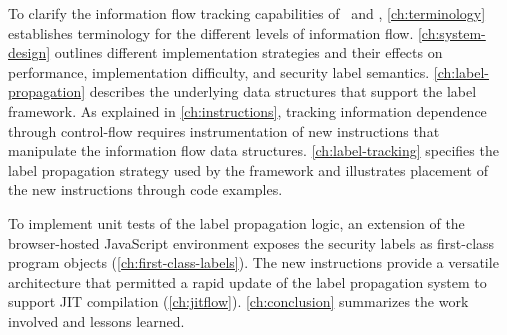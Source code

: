 To clarify the information flow tracking capabilities of \FlowCore\ and \JitFlow, \autoref{ch:terminology} establishes terminology for the different levels of information flow.
\autoref{ch:system-design} outlines different implementation strategies and their effects on performance, implementation difficulty, and security label semantics.
\autoref{ch:label-propagation} describes the underlying data structures that support the label framework.
As explained in \autoref{ch:instructions}, tracking information dependence through control-flow requires instrumentation of new instructions that manipulate the information flow data structures.
\autoref{ch:label-tracking} specifies the label propagation strategy used by the framework and illustrates placement of the new instructions through code examples.

To implement unit tests of the label propagation logic, an extension of the browser-hosted JavaScript environment exposes the security labels as first-class program objects (\autoref{ch:first-class-labels}).
The new instructions provide a versatile architecture that permitted a rapid update of the label propagation system to support JIT compilation (\autoref{ch:jitflow}).
\autoref{ch:conclusion} summarizes the work involved and lessons learned.

\begin{comment}
on using information flow techniques which can detect and prevent malicious behavior of executing programs.

- change language semantics
- augment memory model with labels
- detect and intercept xss
- prevent information leakage

Combine earlier approaches into a universal and comprehensive framework
- decentralized labeling
- support more flexible policies
- hybrid static/dynamic analysis
- dynamically track information flow
- pervasively works at the lowest layer
\end{comment}
